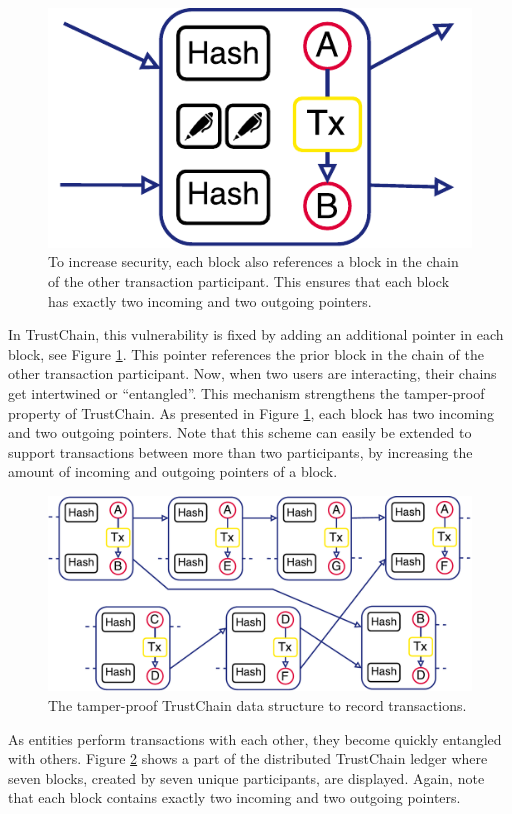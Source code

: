 \documentclass[USenglish]{article}
\begin{document}
\begin{figure}[h!]
	\centering
	\includegraphics[width=0.5\columnwidth]{assets/trustchain_tutorial_3}
	\caption{To increase security, each block also references a block in the chain of the other transaction participant. This ensures that each block has exactly two incoming and two outgoing pointers.}
	\label{fig:trustchain_tutorial_3}
\end{figure}

In TrustChain, this vulnerability is fixed by adding an additional pointer in each block, see Figure \ref{fig:trustchain_tutorial_3}.
This pointer references the prior block in the chain of the other transaction participant.
Now, when two users are interacting, their chains get intertwined or \enquote{entangled}.
This mechanism strengthens the tamper-proof property of TrustChain.
As presented in Figure \ref{fig:trustchain_tutorial_3}, each block has two incoming and two outgoing pointers.
Note that this scheme can easily be extended to support transactions between more than two participants, by increasing the amount of incoming and outgoing pointers of a block.

\begin{figure}[h!]
	\centering
	\includegraphics[width=0.9\columnwidth]{assets/trustchain}
	\caption{The tamper-proof TrustChain data structure to record transactions.}
	\label{fig:trustchain}
\end{figure}

As entities perform transactions with each other, they become quickly entangled with others.
Figure \ref{fig:trustchain} shows a part of the distributed TrustChain ledger where seven blocks, created by seven unique participants, are displayed.
Again, note that each block contains exactly two incoming and two outgoing pointers.
\end{document}
